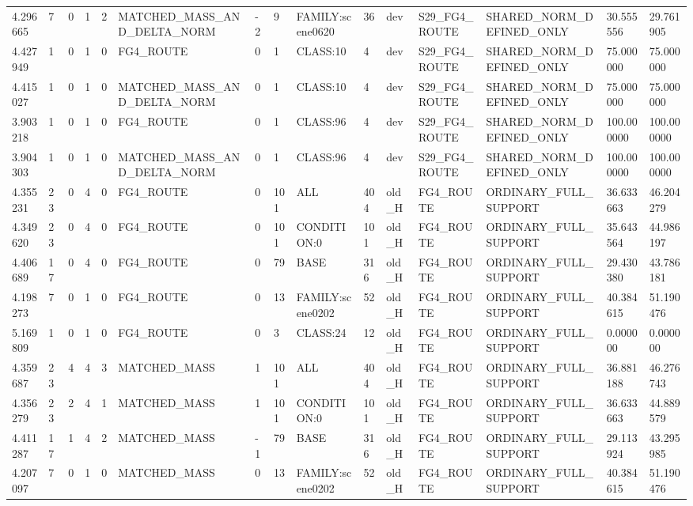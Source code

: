 \begin{tabular}{lllllllllllllll}
4.296665 & 7 & 0 & 1 & 2 & MATCHED\_MASS\_AND\_DELTA\_NORM & -2 & 9 & FAMILY:scene0620 & 36 & dev & S29\_FG4\_ROUTE & SHARED\_NORM\_DEFINED\_ONLY & 30.555556 & 29.761905 \\
4.427949 & 1 & 0 & 1 & 0 & FG4\_ROUTE & 0 & 1 & CLASS:10 & 4 & dev & S29\_FG4\_ROUTE & SHARED\_NORM\_DEFINED\_ONLY & 75.000000 & 75.000000 \\
4.415027 & 1 & 0 & 1 & 0 & MATCHED\_MASS\_AND\_DELTA\_NORM & 0 & 1 & CLASS:10 & 4 & dev & S29\_FG4\_ROUTE & SHARED\_NORM\_DEFINED\_ONLY & 75.000000 & 75.000000 \\
3.903218 & 1 & 0 & 1 & 0 & FG4\_ROUTE & 0 & 1 & CLASS:96 & 4 & dev & S29\_FG4\_ROUTE & SHARED\_NORM\_DEFINED\_ONLY & 100.000000 & 100.000000 \\
3.904303 & 1 & 0 & 1 & 0 & MATCHED\_MASS\_AND\_DELTA\_NORM & 0 & 1 & CLASS:96 & 4 & dev & S29\_FG4\_ROUTE & SHARED\_NORM\_DEFINED\_ONLY & 100.000000 & 100.000000 \\
4.355231 & 23 & 0 & 4 & 0 & FG4\_ROUTE & 0 & 101 & ALL & 404 & old\_H & FG4\_ROUTE & ORDINARY\_FULL\_SUPPORT & 36.633663 & 46.204279 \\
4.349620 & 23 & 0 & 4 & 0 & FG4\_ROUTE & 0 & 101 & CONDITION:0 & 101 & old\_H & FG4\_ROUTE & ORDINARY\_FULL\_SUPPORT & 35.643564 & 44.986197 \\
4.406689 & 17 & 0 & 4 & 0 & FG4\_ROUTE & 0 & 79 & BASE & 316 & old\_H & FG4\_ROUTE & ORDINARY\_FULL\_SUPPORT & 29.430380 & 43.786181 \\
4.198273 & 7 & 0 & 1 & 0 & FG4\_ROUTE & 0 & 13 & FAMILY:scene0202 & 52 & old\_H & FG4\_ROUTE & ORDINARY\_FULL\_SUPPORT & 40.384615 & 51.190476 \\
5.169809 & 1 & 0 & 1 & 0 & FG4\_ROUTE & 0 & 3 & CLASS:24 & 12 & old\_H & FG4\_ROUTE & ORDINARY\_FULL\_SUPPORT & 0.000000 & 0.000000 \\
4.359687 & 23 & 4 & 4 & 3 & MATCHED\_MASS & 1 & 101 & ALL & 404 & old\_H & FG4\_ROUTE & ORDINARY\_FULL\_SUPPORT & 36.881188 & 46.276743 \\
4.356279 & 23 & 2 & 4 & 1 & MATCHED\_MASS & 1 & 101 & CONDITION:0 & 101 & old\_H & FG4\_ROUTE & ORDINARY\_FULL\_SUPPORT & 36.633663 & 44.889579 \\
4.411287 & 17 & 1 & 4 & 2 & MATCHED\_MASS & -1 & 79 & BASE & 316 & old\_H & FG4\_ROUTE & ORDINARY\_FULL\_SUPPORT & 29.113924 & 43.295985 \\
4.207097 & 7 & 0 & 1 & 0 & MATCHED\_MASS & 0 & 13 & FAMILY:scene0202 & 52 & old\_H & FG4\_ROUTE & ORDINARY\_FULL\_SUPPORT & 40.384615 & 51.190476 \\

\end{tabular}
